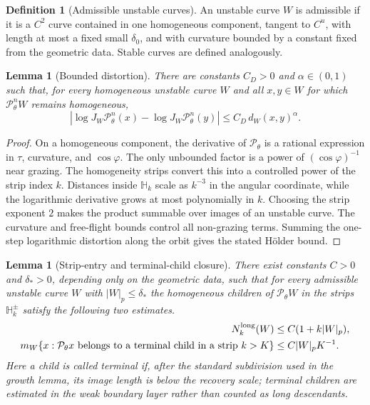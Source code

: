 \documentclass[12pt, letterpaper]{amsart}
\newcommand{\Pcal}{\mathcal{P}}
\theoremstyle{plain}
\newtheorem{lemma}[theorem]{Lemma}
\theoremstyle{definition}
\newtheorem{definition}[theorem]{Definition}
\theoremstyle{remark}
\begin{document}
\begin{definition}[Admissible unstable curves]
An unstable curve $W$ is admissible if it is a $C^2$ curve contained in one homogeneous component, tangent to $C^u$, with length at most a fixed small $\delta_0$, and with curvature bounded by a constant fixed from the geometric data.  Stable curves are defined analogously.
\end{definition}

\begin{lemma}[Bounded distortion]
\label{lem:bounded_distortion}
There are constants $C_D>0$ and $\alpha\in(0,1)$ such that, for every homogeneous unstable curve $W$ and all $x,y\in W$ for which $\Pcal_\theta^nW$ remains homogeneous,
\begin{equation}
    \left|\log J_W\Pcal_\theta^n(x)-\log J_W\Pcal_\theta^n(y)\right|
    \le C_D\,d_W(x,y)^\alpha .
\end{equation}
\end{lemma}

\begin{proof}
On a homogeneous component, the derivative of $\Pcal_\theta$ is a rational expression in $\tau$, curvature, and $\cos\varphi$.  The only unbounded factor is a power of $(\cos\varphi)^{-1}$ near grazing.  The homogeneity strips convert this into a controlled power of the strip index $k$.  Distances inside $\mathbb H_k$ scale as $k^{-3}$ in the angular coordinate, while the logarithmic derivative grows at most polynomially in $k$.  Choosing the strip exponent $2$ makes the product summable over images of an unstable curve.  The curvature and free-flight bounds control all non-grazing terms.  Summing the one-step logarithmic distortion along the orbit gives the stated H\"older bound.
\end{proof}


\begin{lemma}[Strip-entry and terminal-child closure]
\label{lem:strip_entry_terminal_closure}
There exist constants $C>0$ and $\delta_*>0$, depending only on the geometric
data, such that for every admissible unstable curve $W$ with $|W|_p\le\delta_*$
the homogeneous children of $\Pcal_\theta W$ in the strips $\mathbb H_k^\pm$
satisfy the following two estimates.
\begin{align}
\label{eq:strip_child_count_refined}
    N_k^{\rm long}(W)&\le C(1+k|W|_p),\\
\label{eq:terminal_child_mass_refined}
    m_W\{x:\Pcal_\theta x \hbox{ belongs to a terminal child in a strip }k>K\}
    &\le C|W|_p K^{-1} .
\end{align}
Here a child is called terminal if, after the standard subdivision used in the
growth lemma, its image length is below the recovery scale; terminal children
are estimated in the weak boundary layer rather than counted as long descendants.
\end{lemma}
\end{document}
